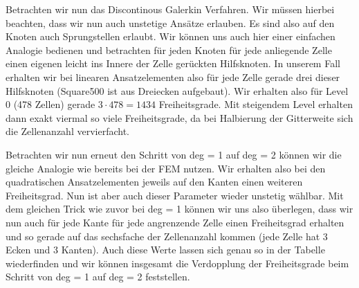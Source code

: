 \begin{figure}[H]
	\centering
\end{figure}

Betrachten wir nun das Discontinous Galerkin Verfahren. Wir müssen hierbei beachten, dass wir nun auch unstetige Ansätze erlauben. Es sind also auf den Knoten auch Sprungstellen erlaubt. Wir können uns auch hier einer einfachen Analogie bedienen und betrachten für jeden Knoten für jede anliegende Zelle einen eigenen leicht ins Innere der Zelle gerückten Hilfsknoten. In unserem Fall erhalten wir bei linearen Ansatzelementen also für jede Zelle gerade drei dieser Hilfsknoten (Square500 ist aus Dreiecken aufgebaut). Wir erhalten also für Level 0 (478 Zellen) gerade $3 \cdot 478 = 1434$ Freiheitsgrade. Mit steigendem Level erhalten dann exakt viermal so viele Freiheitsgrade, da bei Halbierung der Gitterweite sich die Zellenanzahl vervierfacht. 

Betrachten wir nun erneut den Schritt von deg = 1 auf deg = 2 können wir die gleiche Analogie wie bereits bei der FEM nutzen. Wir erhalten also bei den quadratischen Ansatzelementen jeweils auf den Kanten einen weiteren Freiheitsgrad. Nun ist aber auch dieser Parameter wieder unstetig wählbar. Mit dem gleichen Trick wie zuvor bei deg = 1 können wir uns also überlegen, dass wir nun auch für jede Kante für jede angrenzende Zelle einen Freiheitsgrad erhalten und so gerade auf das sechsfache der Zellenanzahl kommen (jede Zelle hat 3 Ecken und 3 Kanten).
Auch diese Werte lassen sich genau so in der Tabelle wiederfinden und wir können insgesamt die Verdopplung der Freiheitsgrade beim Schritt von deg = 1 auf deg = 2 feststellen.





